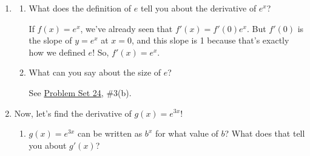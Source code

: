 \documentclass{article}
\begin{document}
\begin{enumerate}[resume]
\item  
  \begin{enumerate}

  \item
    \begin{problem}[\vfill]
      What does the definition of $e$ tell you about the derivative of $e^x$?
    \end{problem}

    \begin{solution}
      If $f(x) = e^x$, we've already seen that $f'(x) = f'(0) e^x$. But $f'(0)$ is the slope of $y = e^x$ at $x = 0$, and this slope is 1 because that's exactly how we defined $e$! So, $f'(x) = e^x$. 

    \end{solution}  

  \item


    \begin{problem}[\stretch{0.5}]
      What can you say about the size of $e$?
    \end{problem}

    \begin{solution}
      See \href{https://people.math.harvard.edu/~jjchen/mathma/docs/homework/PS24.html}{Problem Set 24}, {{{{\#3}}(b)}}. 
    \end{solution}

  \end{enumerate}

\item  \label{deriv-of-e^3x}

  Now, let's find the derivative of $g(x) = e^{3x}$!

  \begin{enumerate}
  \item \label{deriv-of-e^3x-a}


    \begin{problem}[\stretch{0.5}]
      $g(x) = e^{3x}$ can be written as $b^x$ for what value of $b$? What does that tell you about $g'(x)$? 
    \end{problem}


\end{enumerate}
\end{enumerate}
\end{document}
